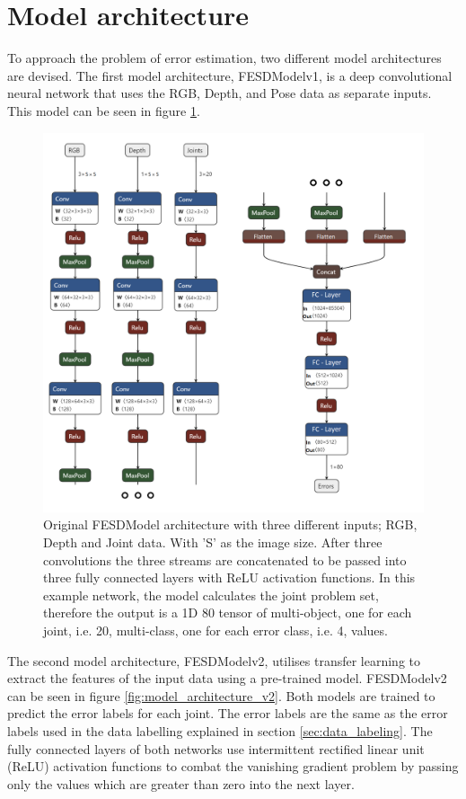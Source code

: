 \section{Model architecture}
\label{sec:model_architecture}

To approach the problem of error estimation, two different model architectures are devised. The first model architecture, FESDModelv1, is a deep convolutional neural network that uses the RGB, Depth, and Pose data as separate inputs. This model can be seen in figure \ref{fig:model_architecture_v1}.

\begin{figure}[ht]
  \centering
  \includegraphics[width=.8\linewidth]{figures/Model/FESD.png}
  \caption[FESDModel architecture version 1]{Original FESDModel architecture with three different inputs; RGB, Depth and Joint data. With 'S' as the image size. After three convolutions the three streams are concatenated to be passed into three fully connected layers with ReLU activation functions. In this example network, the model calculates the joint problem set, therefore the output is a 1D 80 tensor of multi-object, one for each joint, i.e. 20, multi-class, one for each error class, i.e. 4, values.}
  \label{fig:model_architecture_v1}
\end{figure}

The second model architecture, FESDModelv2, utilises transfer learning to extract the features of the input data using a pre-trained model. FESDModelv2 can be seen in figure \ref{fig:model_architecture_v2}. Both models are trained to predict the error labels for each joint. The error labels are the same as the error labels used in the data labelling explained in section \ref{sec:data_labeling}. The fully connected layers of both networks use intermittent rectified linear unit (ReLU) activation functions to combat the vanishing gradient problem by passing only the values which are greater than zero into the next layer.

